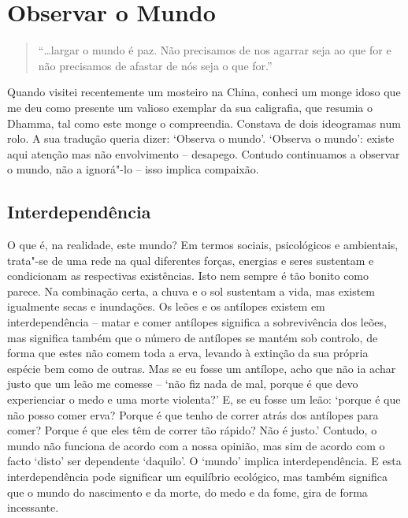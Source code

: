 \chapter{Observar o Mundo}

\begin{quote}
  ``\ldots{}largar o mundo é paz. Não precisamos de nos agarrar seja ao que for e não precisamos de afastar de nós seja o que for.''

\end{quote}

Quando visitei recentemente um mosteiro na China, conheci um monge idoso que me
deu como presente um valioso exemplar da sua caligrafia, que resumia o Dhamma,
tal como este monge o compreendia. Constava de dois ideogramas num rolo. A sua
tradução queria dizer: `Observa o mundo'. `Observa o mundo': existe aqui atenção
mas não envolvimento -- desapego. Contudo continuamos a observar o mundo, não a
ignorá"-lo -- isso implica compaixão.

\section{Interdependência}

O que é, na realidade, este mundo? Em termos sociais, psicológicos e ambientais,
trata"-se de uma rede na qual diferentes forças, energias e seres sustentam e
condicionam as respectivas existências. Isto nem sempre é tão bonito como
parece. Na combinação certa, a chuva e o sol sustentam a vida, mas existem
igualmente secas e inundações. Os leões e os antílopes existem em
interdependência -- matar e comer antílopes significa a sobrevivência dos leões,
mas significa também que o número de antílopes se mantém sob controlo, de forma
que estes não comem toda a erva, levando à extinção da sua própria espécie bem
como de outras. Mas se eu fosse um antílope, acho que não ia achar justo que um
leão me comesse -- `não fiz nada de mal, porque é que devo experienciar o medo e
uma morte violenta?' E, se eu fosse um leão: `porque é que não posso comer erva?
Porque é que tenho de correr atrás dos antílopes para comer? Porque é que eles
têm de correr tão rápido? Não é justo.' Contudo, o mundo não funciona de acordo
com a nossa opinião, mas sim de acordo com o facto `disto' ser dependente
`daquilo'. O `mundo' implica interdependência. E esta interdependência pode
significar um equilíbrio ecológico, mas também significa que o mundo do
nascimento e da morte, do medo e da fome, gira de forma incessante.

